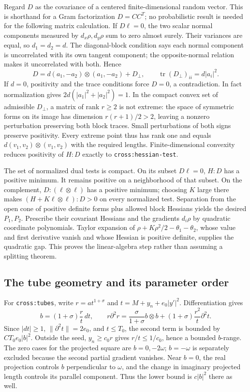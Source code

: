 \documentclass[11pt]{article}
\theoremstyle{definition}
\theoremstyle{remark}
\numberwithin{equation}{section}
\begin{document}
Regard $D$ as the covariance of a centered finite-dimensional random vector. This is shorthand for a Gram factorization $D=CC^T$; no probabilistic result is needed for the following matrix calculation.
If $D\ell=0$, the two scalar normal components measured by
$d_x\rho,d_y\rho$ sum to zero almost surely. Their variances are equal,
so $d_1=d_2=d$. The diagonal-block condition says each normal component
is uncorrelated with its own tangent component; the opposite-normal relation
makes it uncorrelated with both. Hence
\[
 D=d(a_1,-a_2)\otimes(a_1,-a_2)+D_\perp,
 \qquad \operatorname{tr}(D_\perp)_{ii}=d|a_i|^2.
\]
If $d=0$, positivity and the trace conditions force $D=0$, a contradiction.
In fact normalization gives $2d(|a_1|^2+|a_2|^2)=1$.
In the compact convex set of admissible $D_\perp$, a matrix of rank
$r\ge2$ is not extreme: the space of symmetric forms on its image has
dimension $r(r+1)/2>2$, leaving a nonzero perturbation preserving both
block traces. Small perturbations of both signs preserve positivity.
Every extreme point thus has rank one and equals
$d(v_1,v_2)\otimes(v_1,v_2)$ with the required lengths. Finite-dimensional
convexity reduces positivity of $H:D$ exactly to
\texttt{cross:hessian-test}.

The set of normalized dual tests is compact. On its subset $D\ell=0$,
$H:D$ has a positive minimum. It remains positive on a neighborhood of
that subset. On the complement, $D:(\ell\otimes\ell)$ has a positive
minimum; choosing $K$ large there makes
$(H+K\ell\otimes\ell):D>0$ on every normalized test. Separation from the
open cone of positive definite forms plus allowed block Hessians yields
the desired $P_1,P_2$. Prescribe their covariant Hessians and the gradients
$d_i\rho$ by quadratic coordinate polynomials. Taylor expansion of
$\rho+K\rho^2/2-\theta_1-\theta_2$, whose value and first derivative
vanish and whose Hessian is positive definite, supplies the quadratic gap.
This proves the linear-algebra step rather than assuming a splitting theorem.

\subsection{The tube geometry and its parameter order}
\label{cross-expanded:tubes}
For \texttt{cross:tubes}, write $r=a t^{1+\sigma}$ and
$t=M+y_n+e_0|y'|^2$. Differentiation gives
\[
 b=(1+\sigma)\frac r t\,dt,\qquad
 r\partial^2r=\frac{\sigma}{1+\sigma}b\otimes b
                +(1+\sigma)\frac{r^2}{t}\partial^2t.
\]
Since $|dt|\ge1$, $\|\partial^2t\|=2e_0$, and $t\le T_0$, the second
term is bounded by $C T_0e_0|b|^2$. Outside the seed,
$y_n\ge c_0r$ gives $r/t\le1/c_0$, hence a bounded $b$-range.
The zero cases for the projected square are $b=0,-2\omega$;
$b=-\omega$ is separately excluded because the second partial gradient
vanishes. Near $b=0$, the real projection controls $b$ perpendicular
to $\omega$, and the change in imaginary projected length controls its
parallel component. Thus the lower bound is $c|b|^2$ there as well.
\end{document}
